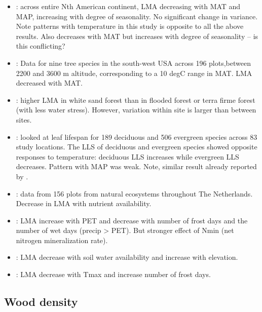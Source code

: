 \documentclass[a4paper,11pt]{article}
\begin{document}
\begin{itemize}
\item \citet{Simova-2015}: across entire Nth American continent, LMA decreasing with MAT and MAP, increasing with degree of seasonality. No significant change in variance. Note patterns with temperature in this study is opposite to all the above results. Also decreases with MAT but increases with degree of seasonality -- is this conflicting?

\item \citet{Laughlin-2012}: Data for nine tree species in the south-west USA across 196 plots,between 2200 and 3600 m altitude, corresponding to a 10 degC range in MAT. LMA decreased with MAT.

\item \citet{Fortunel-2014}: higher LMA  in white sand forest than in flooded forest or terra firme forest (with less water stress). However, variation within site is larger than between sites.

\item \citet{vanOmmenKloeke-2012}: looked at leaf lifespan for 189 deciduous and 506 evergreen species across 83 study locations. The LLS of deciduous and evergreen species showed opposite responses to temperature: deciduous LLS increases while evergreen LLS decreases. Pattern with MAP was weak. Note, similar result already reported by \citet{Wright-2005}.

\item \citet{Douma-2011}: data from 156 plots from natural ecosystems throughout The Netherlands.  Decrease in LMA with nutrient availability.

\item \citet{VanBodegom-2014}: LMA increase with PET and decrease with number of frost days and the number of wet days (precip > PET). But stronger effect of Nmin (net nitrogen mineralization rate).

\item \citet{Cornwell-2009}: LMA decrease with soil water availability and increase with elevation.

\item \citet{Maire-2015}: LMA decrease with Tmax and increase number of frost days.
\end{itemize}

\subsection{Wood density}
\end{document}
